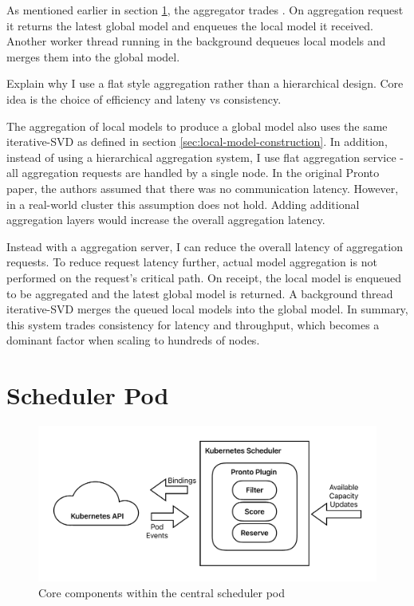 As mentioned earlier in section \ref{}, the aggregator trades
. On aggregation request it returns the
latest global model and enqueues the local model it received. Another worker
thread running in the background dequeues local models and merges them into the
global model.

Explain why I use a flat style aggregation rather than a hierarchical design.
Core idea is the choice of efficiency and lateny vs consistency.

The aggregation of local models to produce a global model also uses the same
iterative-SVD as defined in section \ref{sec:local-model-construction}. In
addition, instead of using a hierarchical aggregation system, I use flat
aggregation service - all aggregation requests are handled by a single node.
In the original Pronto paper, the authors assumed that there was no
communication latency. However, in a real-world cluster this assumption does not
hold. Adding additional aggregation layers would increase the overall aggregation
latency.

Instead with a aggregation server, I can reduce the overall latency of
aggregation requests. To reduce request latency further, actual model
aggregation is not performed on the request's critical path. On receipt, the local
model is enqueued to be aggregated and the latest global model is returned. A
background thread iterative-SVD merges the queued local models into the global
model. In summary, this system trades consistency for latency and throughput,
which becomes a dominant factor when scaling to hundreds of nodes.

\section{Scheduler Pod}
\begin{figure}[H]
    \centering
    \includegraphics[width=\textwidth]{images/spazio-sched.pdf}
    \caption{Core components within the central scheduler pod}
    \label{spazio-sched-components}
\end{figure}

